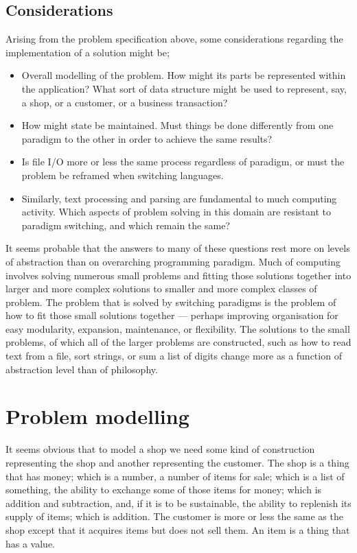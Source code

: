 \documentclass[12pt, a4paper]{article}
\begin{document}
\subsection{Considerations}
Arising from the problem specification above, some considerations regarding the implementation of a solution might be;
\begin{itemize}
    \item Overall modelling of the problem. How might its parts be represented within the application? What sort of data structure might be used to represent, say, a shop, or a customer, or a business transaction?
    \item How might state be maintained. Must things be done differently from one paradigm to the other in order to achieve the same results?
    \item Is file I/O more or less the same process regardless of paradigm, or must the problem be reframed when switching languages.
    \item Similarly, text processing and parsing are fundamental to much computing activity. Which aspects of problem solving in this domain are resistant to paradigm switching, and which remain the same?
\end{itemize}

It seems probable that the answers to many of these questions rest more on levels of abstraction than on overarching programming paradigm. Much of computing involves solving numerous small problems and fitting those solutions together into larger and more complex solutions to smaller and more complex classes of problem. The problem that is solved by switching paradigms is the problem of how to fit those small solutions together --- perhaps improving organisation for easy modularity, expansion, maintenance, or flexibility. The solutions to the small problems, of which all of the larger problems are constructed, such as how to read text from a file, sort strings, or sum a list of digits change more as a function of abstraction level than of philosophy.

\section{Problem modelling}

It seems obvious that to model a shop we need some kind of construction representing the shop and another representing the customer. The shop is a thing that has money; which is a number, a number of items for sale; which is a list of something, the ability to exchange some of those items for money; which is addition and subtraction, and, if it is to be sustainable, the ability to replenish its supply of items; which is addition. The customer is more or less the same as the shop except that it acquires items but does not sell them. An item is a thing that has a value.
\end{document}
